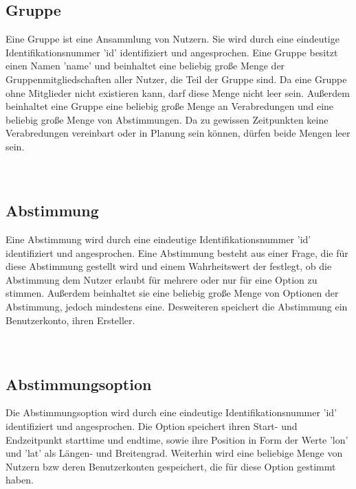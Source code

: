 \documentclass[parskip=full,11pt]{scrartcl}
\begin{document}
\subsection{Gruppe}
Eine Gruppe ist eine Ansammlung von Nutzern. Sie wird durch eine eindeutige
Identifikationsnummer 'id' identifiziert und angesprochen. Eine Gruppe besitzt
einen Namen 'name' und beinhaltet eine beliebig große Menge der
Gruppenmitgliedschaften aller Nutzer, die Teil der Gruppe sind.
Da eine Gruppe ohne Mitglieder nicht existieren kann, darf diese Menge nicht
leer sein. Außerdem beinhaltet eine Gruppe eine beliebig große Menge an
Verabredungen und eine beliebig große Menge von Abstimmungen.
Da zu gewissen Zeitpunkten keine Verabredungen vereinbart oder in Planung sein
können, dürfen beide Mengen leer sein.
\\
\\
\\

\pagebreak


\subsection{Abstimmung}
Eine Abstimmung wird durch eine eindeutige Identifikationsnummer 'id'
identifiziert und angesprochen.
Eine Abstimmung besteht aus einer Frage, die für diese Abstimmung gestellt wird
und einem Wahrheitswert der festlegt,
ob die Abstimmung dem Nutzer erlaubt für mehrere oder nur für eine Option zu
stimmen.
Außerdem beinhaltet sie eine beliebig große Menge von Optionen der Abstimmung,
jedoch mindestens eine.
Desweiteren speichert die Abstimmung ein Benutzerkonto, ihren Ersteller.
\\
\\
\\

\pagebreak


\subsection{Abstimmungsoption}
Die Abstimmungsoption wird durch eine eindeutige Identifikationsnummer 'id'
identifiziert und angesprochen.
Die Option speichert ihren Start- und Endzeitpunkt starttime und endtime,
sowie ihre Position in Form der Werte 'lon' und 'lat' als Längen- und
Breitengrad.
Weiterhin wird eine beliebige Menge von Nutzern bzw deren Benutzerkonten
gespeichert, die für diese Option gestimmt haben.
\\
\\
\\
\end{document}
